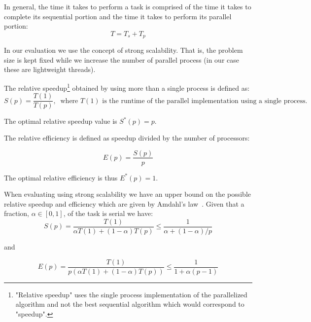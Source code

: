 \documentclass{InsightArticle}
\begin{document}
In general, the time it takes to perform a task is comprised of the time it takes to
complete its sequential portion and the time it takes to perform its
parallel portion:
$$
T = T_s + T_p
$$

In our evaluation we use the concept of strong scalability. That is, the problem size
is kept fixed while we increase the number of parallel process (in our case these are lightweight threads).

The relative speedup\footnote{"Relative speedup" uses the single process implementation of the parallelized algorithm and not the best sequential algorithm which would correspond to "speedup".} obtained by using more than a single process is defined as:
$$
S(p) = \frac{T(1)}{T(p)},\;\; \textrm{where } T(1) \textrm{ is the runtime of the parallel implementation using a single process.}  
$$

The optimal relative speedup value is $S^*(p) = p$. 

The relative efficiency is defined as speedup divided by the number of processors:

$$
E(p) = \frac{S(p)}{p}
$$

The optimal relative efficiency is thus $E^*(p)=1$.

When evaluating using strong scalability we have an upper bound on the possible relative speedup and efficiency which are given
by Amdahl's law~\cite{amdahl1967}. Given that a fraction, $\alpha \in [0,1]$, of the task is serial we have:
$$
S(p) = \frac{T(1)}{\alpha T(1) + (1-\alpha) T(p)} \leq \frac{1}{\alpha + (1-\alpha)/p}
$$ 
 
and

$$
E(p) = \frac{T(1)}{p(\alpha T(1) + (1-\alpha) T(p))} \leq \frac{1}{1 + \alpha(p-1)}
$$ 
\end{document}
